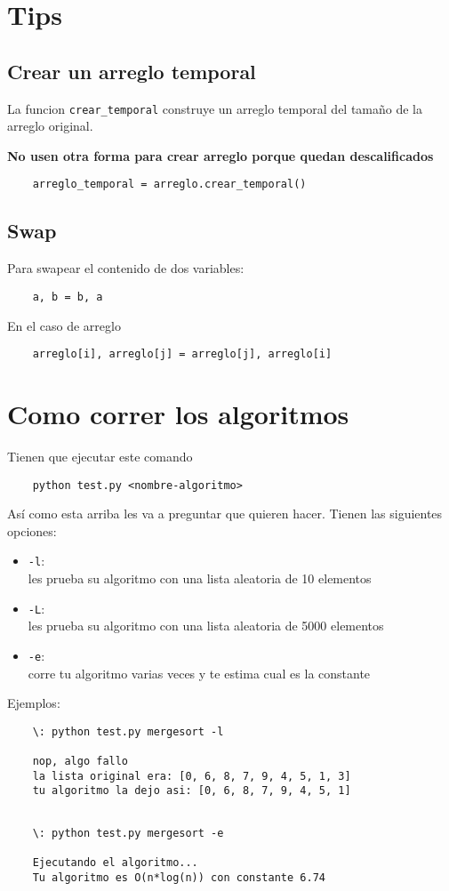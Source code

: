 \documentclass[a4paper, twocolumn]{article}
\begin{document}
\section{Tips}
\subsection{Crear un arreglo temporal}
La funcion \texttt{crear\_temporal} construye un arreglo temporal del tamaño de la arreglo original. 

\textbf{No usen otra forma para crear arreglo porque quedan descalificados}
\begin{verbatim}
    arreglo_temporal = arreglo.crear_temporal()
\end{verbatim}

\subsection{Swap}
Para swapear el contenido de dos variables:
\begin{verbatim}
    a, b = b, a
\end{verbatim}

En el caso de arreglo

\begin{verbatim}
    arreglo[i], arreglo[j] = arreglo[j], arreglo[i]
\end{verbatim}

\section{Como correr los algoritmos}
Tienen que ejecutar este comando

\begin{verbatim}
    python test.py <nombre-algoritmo>
\end{verbatim}

Así como esta arriba les va a preguntar que quieren hacer. Tienen las siguientes opciones:
\begin{itemize}
  \item \texttt{-l}:\\ les prueba su algoritmo con una lista aleatoria de 10 elementos
  \item \texttt{-L}:\\ les prueba su algoritmo con una lista aleatoria de 5000 elementos
  \item \texttt{-e}:\\ corre tu algoritmo varias veces y te estima cual es la constante
\end{itemize}

Ejemplos:
\begin{verbatim}
    \: python test.py mergesort -l

    nop, algo fallo
    la lista original era: [0, 6, 8, 7, 9, 4, 5, 1, 3]
    tu algoritmo la dejo asi: [0, 6, 8, 7, 9, 4, 5, 1]
\end{verbatim}

\begin{verbatim}

    \: python test.py mergesort -e

    Ejecutando el algoritmo...
    Tu algoritmo es O(n*log(n)) con constante 6.74
\end{verbatim}
\end{document}
